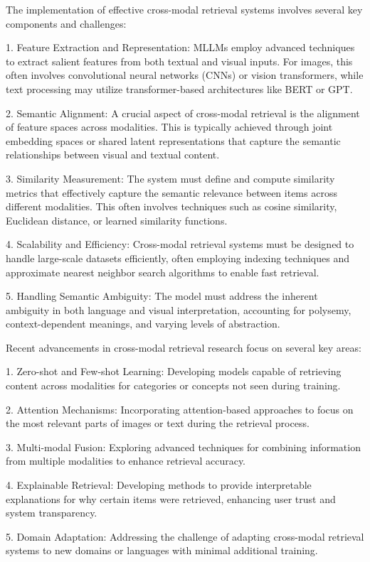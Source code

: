 The implementation of effective cross-modal retrieval systems involves several key components and challenges:

1. Feature Extraction and Representation: MLLMs employ advanced techniques to extract salient features from both textual and visual inputs. For images, this often involves convolutional neural networks (CNNs) or vision transformers, while text processing may utilize transformer-based architectures like BERT or GPT.

2. Semantic Alignment: A crucial aspect of cross-modal retrieval is the alignment of feature spaces across modalities. This is typically achieved through joint embedding spaces or shared latent representations that capture the semantic relationships between visual and textual content.

3. Similarity Measurement: The system must define and compute similarity metrics that effectively capture the semantic relevance between items across different modalities. This often involves techniques such as cosine similarity, Euclidean distance, or learned similarity functions.

4. Scalability and Efficiency: Cross-modal retrieval systems must be designed to handle large-scale datasets efficiently, often employing indexing techniques and approximate nearest neighbor search algorithms to enable fast retrieval.

5. Handling Semantic Ambiguity: The model must address the inherent ambiguity in both language and visual interpretation, accounting for polysemy, context-dependent meanings, and varying levels of abstraction.

Recent advancements in cross-modal retrieval research focus on several key areas:

1. Zero-shot and Few-shot Learning: Developing models capable of retrieving content across modalities for categories or concepts not seen during training.

2. Attention Mechanisms: Incorporating attention-based approaches to focus on the most relevant parts of images or text during the retrieval process.

3. Multi-modal Fusion: Exploring advanced techniques for combining information from multiple modalities to enhance retrieval accuracy.

4. Explainable Retrieval: Developing methods to provide interpretable explanations for why certain items were retrieved, enhancing user trust and system transparency.

5. Domain Adaptation: Addressing the challenge of adapting cross-modal retrieval systems to new domains or languages with minimal additional training.

